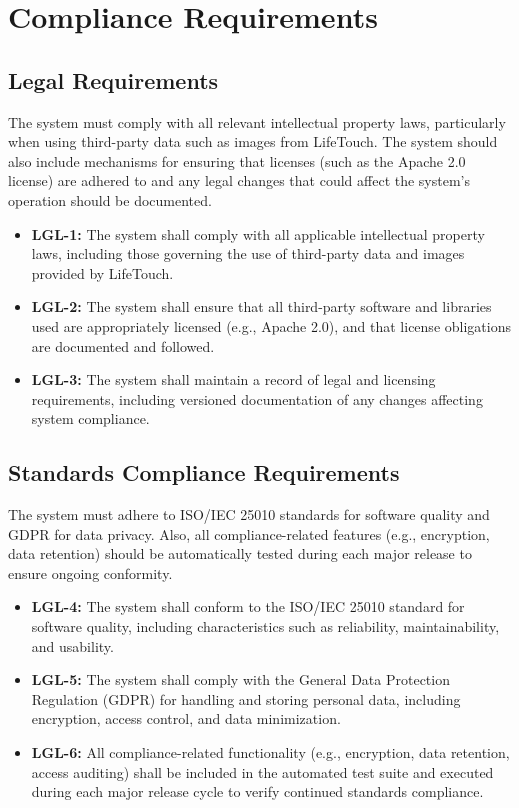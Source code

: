 \documentclass[12pt]{article}
\begin{document}
\section{Compliance Requirements}

\subsection{Legal Requirements}

The system must comply with all relevant intellectual property laws, particularly when using third-party data such as images from LifeTouch. The system should also include mechanisms for ensuring that licenses (such as the Apache 2.0 license) are adhered to and any legal changes that could affect the system’s operation should be documented.

\begin{itemize}
    \item \textbf{LGL-1:} The system shall comply with all applicable intellectual property laws, including those governing the use of third-party data and images provided by LifeTouch.
    \item \textbf{LGL-2:} The system shall ensure that all third-party software and libraries used are appropriately licensed (e.g., Apache 2.0), and that license obligations are documented and followed.
    \item \textbf{LGL-3:} The system shall maintain a record of legal and licensing requirements, including versioned documentation of any changes affecting system compliance.
\end{itemize}

\subsection{Standards Compliance Requirements}

The system must adhere to ISO/IEC 25010 standards for software quality and GDPR for data privacy. Also, all compliance-related features (e.g., encryption, data retention) should be automatically tested during each major release to ensure ongoing conformity.

\begin{itemize}
    \item \textbf{LGL-4:} The system shall conform to the ISO/IEC 25010 standard for software quality, including characteristics such as reliability, maintainability, and usability.
    \item \textbf{LGL-5:} The system shall comply with the General Data Protection Regulation (GDPR) for handling and storing personal data, including encryption, access control, and data minimization.
    \item \textbf{LGL-6:} All compliance-related functionality (e.g., encryption, data retention, access auditing) shall be included in the automated test suite and executed during each major release cycle to verify continued standards compliance.
\end{itemize}
\end{document}
